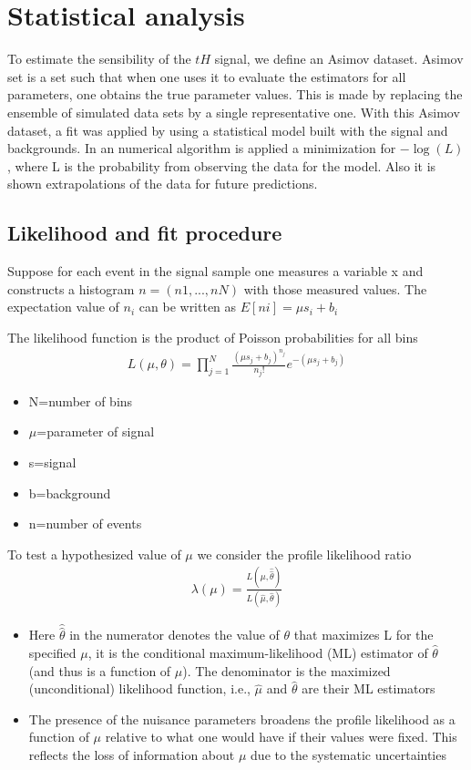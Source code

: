 \chapter{Statistical analysis}
To estimate the sensibility of the $tH$ signal, we define an Asimov dataset. Asimov set is a set such that when one uses it to evaluate the estimators for
all parameters, one obtains the true parameter values. This is made by replacing the ensemble of simulated data sets by a single representative one. 
With this Asimov dataset, a fit was applied by using a statistical model built with the signal and backgrounds. In an numerical algorithm is applied a 	minimization for $-\log{(L)}$, where L is the probability from observing the data for the model. Also it is shown  extrapolations of the data for future predictions.

\section{Likelihood and fit procedure}
Suppose for each event in the signal sample one measures a variable x and constructs a histogram $n = (n1, . . . , nN )$ with those measured values. The expectation value of $n_i$ can be written as
$E[ni] = \mu s_i + b_i$ 


The likelihood function is the product of Poisson probabilities for all bins
\begin{align}
L(\mu,\theta)=\prod_{j=1}^{N}\frac{(\mu s_j +b_j)^{n_j}}{n_j !}e^{-(\mu s_j+b_j)}
\end{align}

\begin{itemize}
	\item	N=number of bins
	\item	$\mu$=parameter of signal
	\item	s=signal
	\item	b=background
	\item	n=number of events
\end{itemize}


To test a hypothesized value of $\mu$ we consider the profile likelihood ratio
\begin{align}
\lambda(\mu)=\frac{L(\mu,\hat{\hat{\theta}})}{L(\hat{\mu},\hat{\theta})}
\end{align}

\begin{itemize}
	\item Here $\hat{\hat{\theta}} $ in the numerator denotes the value of $\theta$ that maximizes L for the specified $\mu$,
	it is the conditional maximum-likelihood (ML) estimator of $\hat{\theta}$ (and thus is a function of $\mu$).
	The denominator is the maximized (unconditional) likelihood function, i.e., $\hat{\mu}$ and $\hat{\theta}$ are
	their ML estimators 
	\item The presence of the nuisance parameters broadens the profile likelihood as a
	function of $\mu$ relative to what one would have if their values were fixed. This reflects the loss
	of information about $\mu$ due to the systematic uncertainties
\end{itemize}

